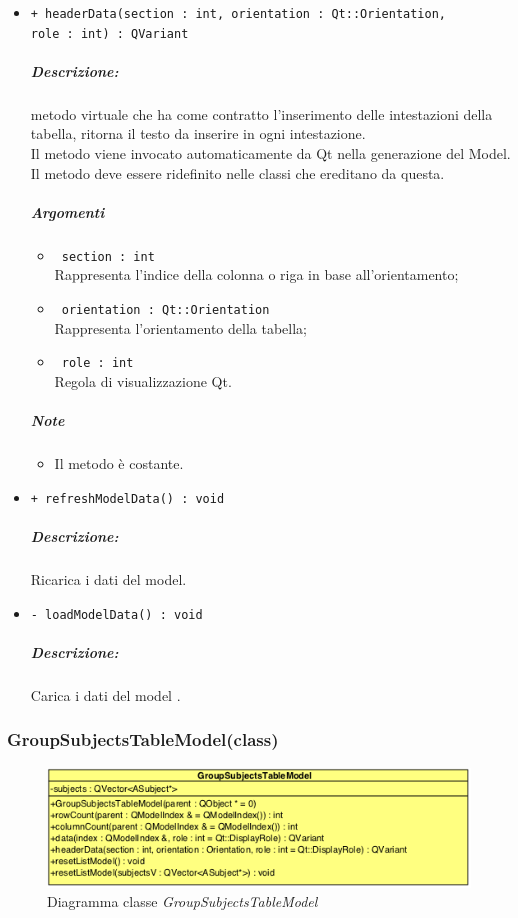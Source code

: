{\begin{itemize}
	\item \color{blue}\verb!+ headerData(section : int, orientation : Qt::Orientation,!\\
	  \verb!role : int) : QVariant!\\
	\color{black}
	\subparagraph{Descrizione:} metodo virtuale che ha come contratto l'inserimento delle intestazioni della tabella, ritorna il testo da inserire in ogni intestazione.\\
	Il metodo viene invocato automaticamente da Qt\g{} nella generazione del Model.\\
	Il metodo deve essere ridefinito nelle classi che ereditano da questa.\\
	\subparagraph{Argomenti}
		\begin{itemize}
			\item \color{RoyalPurple}\verb! section : int!\\
			\color{black}Rappresenta l'indice della colonna o riga in base all'orientamento;
			
			\item \color{RoyalPurple}\verb! orientation : Qt::Orientation!\\
			\color{black}Rappresenta l'orientamento della tabella;
			
			\item \color{RoyalPurple}\verb! role : int!\\
			\color{black}Regola di visualizzazione Qt\g{}.
		\end{itemize}
	\subparagraph{Note}
			\begin{itemize}
				\item Il metodo è costante.
			\end{itemize}
		
	\item \color{blue}\verb!+ refreshModelData() : void!\\
		\color{black}
		\subparagraph{Descrizione:} Ricarica i dati del model.\\
			
	\item \color{blue}\verb!- loadModelData() : void!\\
		\color{black}
		\subparagraph{Descrizione:} Carica i dati del model .\\
\end{itemize}
\pagebreak


\subsubsection{GroupSubjectsTableModel(class)}
\label{GroupSubjectsTableModel}
\begin{figure}[!h]
	\centering
	\includegraphics[width=0.6\linewidth]{./Content/Immagini/QtModel/GroupSubjectsTableModel.png}
	\caption{Diagramma classe \textsl{GroupSubjectsTableModel}}
	\label{comp_GroupSubjectsTableModel}
\end{figure}

}
